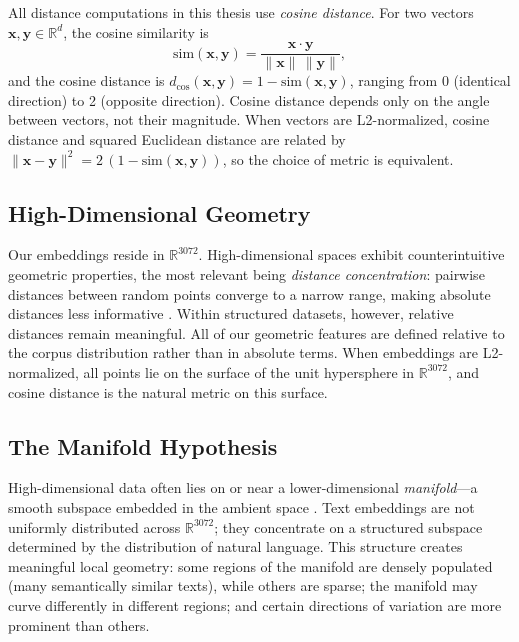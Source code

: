 All distance computations in this thesis use \emph{cosine distance}. For two vectors $\mathbf{x}, \mathbf{y} \in \mathbb{R}^d$, the cosine similarity is
\begin{equation}
\text{sim}(\mathbf{x}, \mathbf{y}) = \frac{\mathbf{x} \cdot \mathbf{y}}{\|\mathbf{x}\|\,\|\mathbf{y}\|},
\label{eq:cosine-sim}
\end{equation}
and the cosine distance is $d_{\cos}(\mathbf{x}, \mathbf{y}) = 1 - \text{sim}(\mathbf{x}, \mathbf{y})$, ranging from 0 (identical direction) to 2 (opposite direction). Cosine distance depends only on the angle between vectors, not their magnitude. When vectors are L2-normalized, cosine distance and squared Euclidean distance are related by $\|\mathbf{x} - \mathbf{y}\|^2 = 2\,(1 - \text{sim}(\mathbf{x}, \mathbf{y}))$, so the choice of metric is equivalent.

\subsection{High-Dimensional Geometry}
\label{sec:bg-highdim}

Our embeddings reside in $\mathbb{R}^{3072}$. High-dimensional spaces exhibit counterintuitive geometric properties, the most relevant being \emph{distance concentration}: pairwise distances between random points converge to a narrow range, making absolute distances less informative \citep{aggarwal2001surprising}. Within structured datasets, however, relative distances remain meaningful. All of our geometric features are defined relative to the corpus distribution rather than in absolute terms. When embeddings are L2-normalized, all points lie on the surface of the unit hypersphere in $\mathbb{R}^{3072}$, and cosine distance is the natural metric on this surface.

\subsection{The Manifold Hypothesis}
\label{sec:bg-manifold}

High-dimensional data often lies on or near a lower-dimensional \emph{manifold}---a smooth subspace embedded in the ambient space \citep{fefferman2016testing}. Text embeddings are not uniformly distributed across $\mathbb{R}^{3072}$; they concentrate on a structured subspace determined by the distribution of natural language. This structure creates meaningful local geometry: some regions of the manifold are densely populated (many semantically similar texts), while others are sparse; the manifold may curve differently in different regions; and certain directions of variation are more prominent than others.

